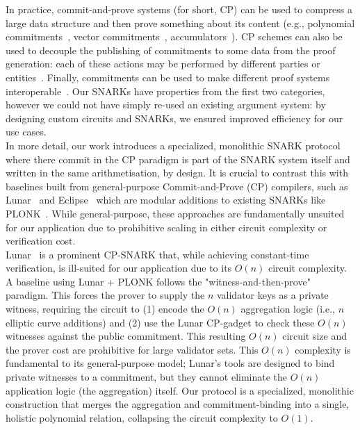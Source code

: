 In practice, commit-and-prove systems (for short, CP) can be used to compress a large data structure and then prove something about its
content (e.g., polynomial commitments~\cite{KZG_10}, vector commitments~\cite{vector_commitment_1}, accumulators~\cite{first_accumulator}).
CP schemes can also be used to decouple the publishing of commitments to some data from the proof generation: each of these actions may be
performed by different parties or entities~\cite{zkp_reference}. Finally, commitments can be used to make different proof systems
interoperable~\cite{CP_paper,interoperability_2}. Our SNARKs have properties from the first two categories, however we could not
have simply re-used an existing argument system: by designing custom circuits and SNARKs, we ensured improved efficiency for our use cases. \\

In more detail, our work introduces a specialized, monolithic SNARK protocol where there commit in the CP paradigm is part of the SNARK system itself and 
written in the same arithmetisation, by design. It is crucial to contrast this with baselines built from general-purpose Commit-and-Prove (CP) compilers, 
such as Lunar~\cite{lunar} and Eclipse~\cite{eclipse}  which are modular additions to existing SNARKs like PLONK~\cite{plonk}. While general-purpose, 
these approaches are fundamentally unsuited for our application due to 
prohibitive scaling in either circuit complexity or verification cost. \\

Lunar~\cite{lunar} is a prominent CP-SNARK that, while achieving constant-time verification, is ill-suited for our application due to its $O(n)$ circuit complexity. 
A baseline using Lunar + PLONK follows the "witness-and-then-prove" paradigm. This forces the prover to supply the $n$ validator keys as a private witness, 
requiring the circuit to (1) encode the $O(n)$ aggregation logic (i.e., $n$ elliptic curve additions) and (2) use the Lunar CP-gadget to check these $O(n)$ witnesses against the public commitment. 
This resulting $O(n)$ circuit size and the prover cost are prohibitive for large validator sets. This $O(n)$ complexity is fundamental to its general-purpose model; Lunar's tools are designed to 
bind private witnesses to a commitment, but they cannot eliminate the $O(n)$ application logic (the aggregation) itself. Our protocol is a specialized, monolithic construction that merges the aggregation and commitment-binding 
into a single, holistic polynomial relation, collapsing the circuit complexity to $O(1)$. \\

